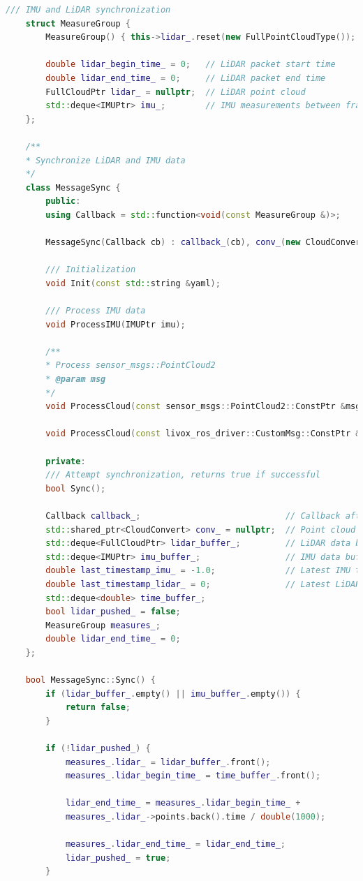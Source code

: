 \begin{lstlisting}[language=c++,caption=src/ch7/loosly_coupled_lio/measure_sync.h]
	/// IMU and LiDAR synchronization
	struct MeasureGroup {
		MeasureGroup() { this->lidar_.reset(new FullPointCloudType()); };
		
		double lidar_begin_time_ = 0;   // LiDAR packet start time
		double lidar_end_time_ = 0;     // LiDAR packet end time
		FullCloudPtr lidar_ = nullptr;  // LiDAR point cloud
		std::deque<IMUPtr> imu_;        // IMU measurements between frames
	};
	
	/**
	* Synchronize LiDAR and IMU data
	*/
	class MessageSync {
		public:
		using Callback = std::function<void(const MeasureGroup &)>;
		
		MessageSync(Callback cb) : callback_(cb), conv_(new CloudConvert) {}
		
		/// Initialization
		void Init(const std::string &yaml);
		
		/// Process IMU data
		void ProcessIMU(IMUPtr imu);
		
		/**
		* Process sensor_msgs::PointCloud2
		* @param msg
		*/
		void ProcessCloud(const sensor_msgs::PointCloud2::ConstPtr &msg);
		
		void ProcessCloud(const livox_ros_driver::CustomMsg::ConstPtr &msg);
		
		private:
		/// Attempt synchronization, returns true if successful
		bool Sync();
		
		Callback callback_;                             // Callback after synchronization
		std::shared_ptr<CloudConvert> conv_ = nullptr;  // Point cloud converter
		std::deque<FullCloudPtr> lidar_buffer_;         // LiDAR data buffer
		std::deque<IMUPtr> imu_buffer_;                 // IMU data buffer
		double last_timestamp_imu_ = -1.0;              // Latest IMU timestamp
		double last_timestamp_lidar_ = 0;               // Latest LiDAR timestamp
		std::deque<double> time_buffer_;
		bool lidar_pushed_ = false;
		MeasureGroup measures_;
		double lidar_end_time_ = 0;
	};
	
	bool MessageSync::Sync() {
		if (lidar_buffer_.empty() || imu_buffer_.empty()) {
			return false;
		}
		
		if (!lidar_pushed_) {
			measures_.lidar_ = lidar_buffer_.front();
			measures_.lidar_begin_time_ = time_buffer_.front();
			
			lidar_end_time_ = measures_.lidar_begin_time_ + 
			measures_.lidar_->points.back().time / double(1000);
			
			measures_.lidar_end_time_ = lidar_end_time_;
			lidar_pushed_ = true;
		}
		

\end{lstlisting}
